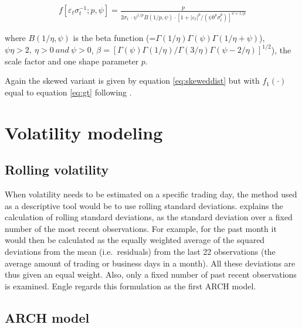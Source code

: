 \documentclass[a4paper, twoside]{templates/ociamthesis}
\begin{document}
\begin{align}
f\left[\varepsilon_{t} \sigma_{t}^{-1} ; p, \psi\right]=\frac{p}{2 \sigma_{t} \ \cdot \psi^{1 / p} B(1 / p, \psi) \cdot\left[1+\left|\varepsilon_{t}\right|^{p} /\left(\psi b^{p} \sigma_{t}^{p}\right)\right]^{\psi+1 / p}}
 \label{eq:gt}
\end{align}

\noindent where \(B(1 / \eta, \psi)\) is the beta function (=\(\Gamma(1 / \eta) \Gamma(\psi) \Gamma(1 / \eta+\psi)\)), \(\psi\eta>2,\ \eta>0 \ and \ \psi >0\), \(\beta = [\Gamma(\psi)\Gamma(1 / \eta)/\Gamma(3 / \eta)\Gamma(\psi - 2/\eta)]^{1/2}\)), the scale factor and one shape parameter \(p\).

\noindent Again the skewed variant is given by equation \eqref{eq:skeweddist} but with \(f_1(\cdot)\) equal to equation \eqref{eq:gt} following \textcite{trottier2015}.

\newpage

\hypertarget{vol-mod}{%
\section{Volatility modeling}\label{vol-mod}}

\hypertarget{rolling-volatility}{%
\subsection{Rolling volatility}\label{rolling-volatility}}

\noindent When volatility needs to be estimated on a specific trading day, the method used as a descriptive tool would be to use rolling standard deviations. \textcite{engle2001} explains the calculation of rolling standard deviations, as the standard deviation over a fixed number of the most recent observations. For example, for the past month it would then be calculated as the equally weighted average of the squared deviations from the mean (i.e.~residuals) from the last 22 observations (the average amount of trading or business days in a month). All these deviations are thus given an equal weight. Also, only a fixed number of past recent observations is examined. Engle regards this formulation as the first ARCH model.

\hypertarget{arch-model}{%
\subsection{ARCH model}\label{arch-model}}
\end{document}
